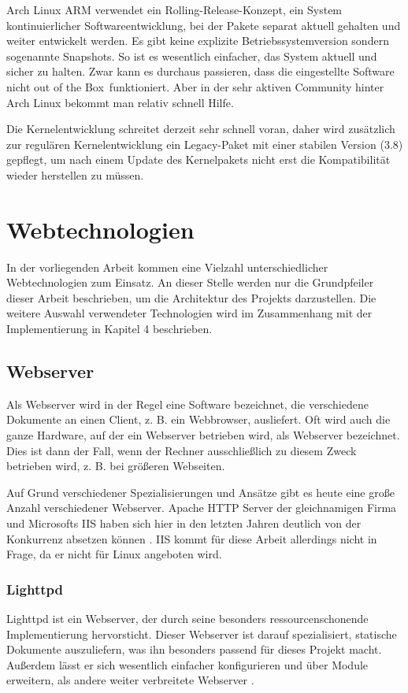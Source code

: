 Arch Linux ARM verwendet ein Rolling-Release-Konzept, ein System kontinuierlicher Softwareentwicklung, bei der Pakete separat aktuell gehalten und weiter entwickelt werden. Es gibt keine explizite Betriebssystemversion sondern sogenannte Snapshots. So ist es  wesentlich einfacher, das System aktuell und sicher zu halten. Zwar kann es durchaus passieren, dass die eingestellte Software nicht \glqq out of the Box\grqq ~funktioniert. Aber in der sehr aktiven Community hinter Arch Linux bekommt man relativ schnell Hilfe.

Die Kernelentwicklung schreitet derzeit sehr schnell voran, daher wird zusätzlich zur regulären Kernelentwicklung ein Legacy-Paket mit einer stabilen Version (3.8) gepflegt, um nach einem Update des Kernelpakets nicht erst die Kompatibilität wieder herstellen zu müssen.


\section{Webtechnologien}
In der vorliegenden Arbeit kommen eine Vielzahl unterschiedlicher Webtechnologien zum Einsatz. An dieser Stelle werden nur die Grundpfeiler dieser Arbeit beschrieben, um die Architektur des Projekts darzustellen. Die weitere Auswahl verwendeter Technologien wird im Zusammenhang mit der Implementierung in Kapitel 4 beschrieben.

\subsection{Webserver}
Als Webserver wird in der Regel eine Software bezeichnet, die verschiedene Dokumente an einen Client, z. B. ein Webbrowser, ausliefert. Oft wird auch die ganze Hardware, auf der ein Webserver betrieben wird, als Webserver bezeichnet. Dies ist dann der Fall, wenn der Rechner ausschließlich zu diesem Zweck betrieben wird, z. B. bei größeren Webseiten.

Auf Grund verschiedener Spezialisierungen und Ansätze gibt es heute eine große Anzahl verschiedener Webserver. Apache HTTP Server der gleichnamigen Firma und Microsofts IIS haben sich hier in den letzten Jahren deutlich von der Konkurrenz absetzen können \cite{webserversurvey1014}. IIS kommt für diese Arbeit allerdings nicht in Frage, da er nicht für Linux angeboten wird.

\subsubsection{Lighttpd}
Lighttpd ist ein Webserver, der durch seine besonders ressourcenschonende Implementierung hervorsticht. Dieser Webserver ist darauf spezialisiert, statische Dokumente auszuliefern, was ihn besonders passend für dieses Projekt macht. Außerdem lässt er sich wesentlich einfacher konfigurieren und über Module erweitern, als andere weiter verbreitete Webserver \cite{krieg2009}.


